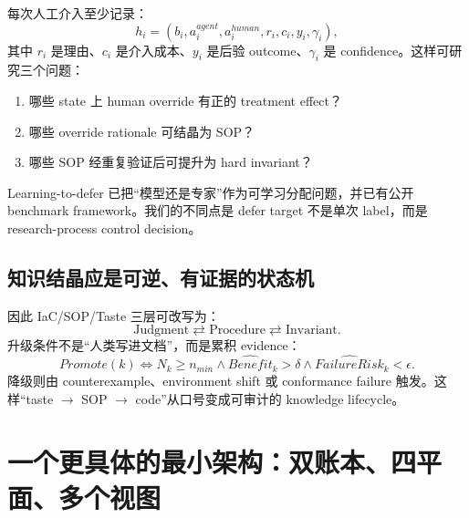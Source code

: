 \documentclass[11pt,a4paper]{ctexart}
\begin{document}
每次人工介入至少记录：
\begin{equation}
 h_i=(b_i,a_i^{agent},a_i^{human},r_i,c_i,y_i,\gamma_i),
\end{equation}
其中 $r_i$ 是理由、$c_i$ 是介入成本、$y_i$ 是后验 outcome、$\gamma_i$ 是 confidence。这样可研究三个问题：
\begin{enumerate}
 \item 哪些 state 上 human override 有正的 treatment effect？
 \item 哪些 override rationale 可结晶为 SOP？
 \item 哪些 SOP 经重复验证后可提升为 hard invariant？
\end{enumerate}
Learning-to-defer 已把“模型还是专家”作为可学习分配问题，并已有公开 benchmark framework\cite{alves2025defer}。我们的不同点是 defer target 不是单次 label，而是 research-process control decision。

\subsection{知识结晶应是可逆、有证据的状态机}

因此 IaC/SOP/Taste 三层可改写为：
\begin{equation}
\text{Judgment}\rightleftarrows\text{Procedure}\rightleftarrows\text{Invariant}.
\end{equation}
升级条件不是“人类写进文档”，而是累积 evidence：
\begin{equation}
Promote(k)\iff
N_k\ge n_{min}\land
\widehat{Benefit}_k>\delta\land
\widehat{FailureRisk}_k<\epsilon.
\end{equation}
降级则由 counterexample、environment shift 或 conformance failure 触发。这样“taste $\to$ SOP $\to$ code”从口号变成可审计的 knowledge lifecycle。

\section{一个更具体的最小架构：双账本、四平面、多个视图}
\end{document}
